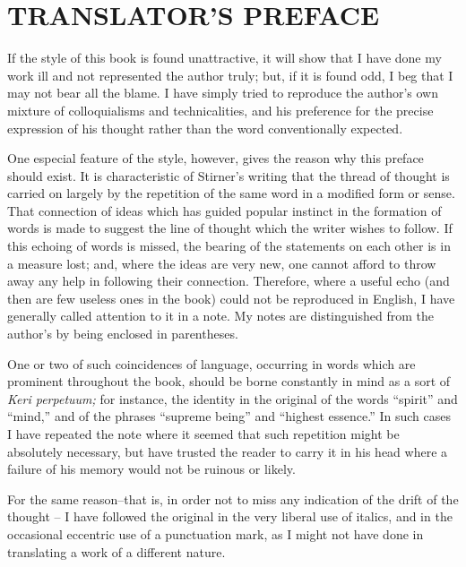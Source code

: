 
\chapter[Translator's Preface]{\centering TRANSLATOR'S PREFACE}

If the style of this book is found unattractive, it will show that I have done 
my work ill and not represented the author truly; but, if it is found odd, I 
beg that I may not bear all the blame. I have simply tried to reproduce the 
author's own mixture of colloquialisms and technicalities, and his preference 
for the precise expression of his thought rather than the word conventionally 
expected.

One especial feature of the style, however, gives the reason why this preface 
should exist. It is characteristic of Stirner's writing that the thread of 
thought is carried on largely by the repetition of the same word in a modified 
form or sense. That connection of ideas which has guided popular instinct in 
the formation of words is made to suggest the line of thought which the writer 
wishes to follow. If this echoing of words is missed, the bearing of the 
statements on each other is in a measure lost; and, where the ideas are very 
new, one cannot afford to throw away any help in following their connection. 
Therefore, where a useful echo (and then are few useless ones in the book) 
could not be reproduced in English, I have generally called attention to it in 
a note. My notes are distinguished from the author's by being enclosed in 
parentheses.

One or two of such coincidences of language, occurring in words which are 
prominent throughout the book, should be borne constantly in mind as a sort of 
\textit{Keri perpetuum;} for instance, the identity in the original of the 
words ``spirit'' and ``mind,'' and of the phrases ``supreme being'' and 
``highest essence.'' In such cases I have repeated the note where it seemed 
that such repetition might be absolutely necessary, but have trusted the 
reader to carry it in his head where a failure of his memory would not be 
ruinous or likely.

For the same reason--that is, in order not to miss any indication of the drift 
of the thought -- I have followed the original in the very liberal use of 
italics, and in the occasional eccentric use of a punctuation mark, as I might 
not have done in translating a work of a different nature.

